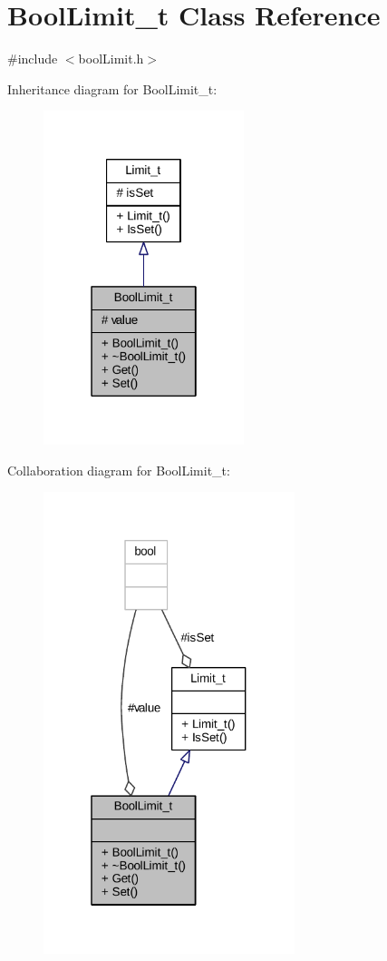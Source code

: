 \hypertarget{class_bool_limit__t}{}\section{Bool\+Limit\+\_\+t Class Reference}
\label{class_bool_limit__t}


{\ttfamily \#include $<$bool\+Limit.\+h$>$}



Inheritance diagram for Bool\+Limit\+\_\+t\+:
\nopagebreak
\begin{figure}[H]
\begin{center}
\leavevmode
\includegraphics[width=166pt]{class_bool_limit__t__inherit__graph}
\end{center}
\end{figure}


Collaboration diagram for Bool\+Limit\+\_\+t\+:
\nopagebreak
\begin{figure}[H]
\begin{center}
\leavevmode
\includegraphics[width=208pt]{class_bool_limit__t__coll__graph}
\end{center}
\end{figure}
